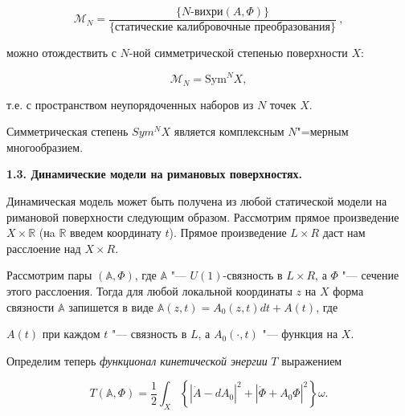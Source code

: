 \begin{equation}

\label{eq111} \mathcal M_N = \frac{\{\text{$N$-вихри

$(A,\Phi)$}\}}{\{\text{статические калибровочные преобразования}\}}\

,

\end{equation}

\smallskip

можно отождествить с $N$-ной симметрической степенью поверхности $X$:

$$

\mathcal M_N=\text{Sym}^N X,

$$

т.е. с пространством неупорядоченных наборов из $N$ точек $X$. 

Симметрическая степень $Sym^N X$ является комплексным $N$"=мерным многообразием.





\smallskip



\textbf{1.3. Динамические модели на римановых поверхностях.}

Динамическая модель может быть получена из любой статической модели на римановой поверхности следующим образом. Рассмотрим прямое произведение $X\times\mathbb R$ (нa $\mathbb R$ введем координату $t$). Прямое произведение $L\times R$ даст нам расслоение над $X\times R$. 

Рассмотрим пары $(\mathbb A,\Phi)$, где $\mathbb A$ "---  $U(1)$-связность в $L\times R$, а $\Phi$ "---  сечение этого расслоения. Тогда для любой локальной координаты $z$ на $X$ форма связности $\mathbb A$ запишется в виде $\mathbb A(z,t)=A_0(z,t)dt+A(t)$, где 

$A(t)$ при каждом $t$ "---  связность в $L$, а $A_0(\cdot,t)$ "---  функция на $X$.



Определим теперь \textit{функционал кинетической энергии} $T$ выражением

\begin{equation}

\label{riemannkinetic}

T(\mathbb A,\Phi)=\dfrac12\int _X\left\{|\dot A-dA_0|^2+|\dot\Phi+A_0\Phi|^2\right\}\omega.

\end{equation}


